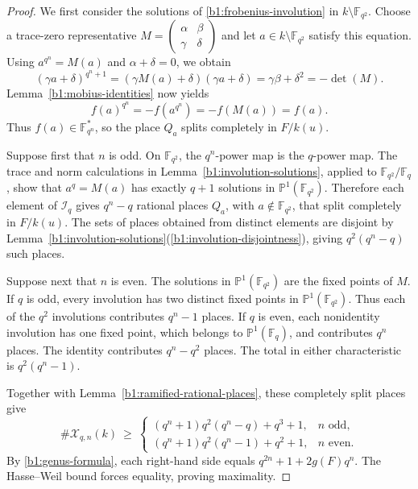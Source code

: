 \documentclass[12pt,reqno]{amsart}
\numberwithin{equation}{section}
\newcommand{\F}{\mathbb F}
\newcommand{\PP}{\mathbb P}
\theoremstyle{plain}
\theoremstyle{definition}
\theoremstyle{remark}
\begin{document}
\begin{proof}
We first consider the solutions of \eqref{b1:frobenius-involution}
in \(k\setminus\F_{q^2}\). Choose a trace-zero representative
\(M=\left(\begin{smallmatrix}\alpha&\beta\\\gamma&\delta\end{smallmatrix}\right)\)
and let \(a\in k\setminus\F_{q^2}\) satisfy this equation.
Using \(a^{q^n}=M(a)\) and \(\alpha+\delta=0\), we obtain
\[
 (\gamma a+\delta)^{q^n+1}
 =(\gamma M(a)+\delta)(\gamma a+\delta)
 =\gamma\beta+\delta^2=-\det(M).
\]
Lemma~\ref{b1:mobius-identities} now yields
\[
 f(a)^{q^n}=-f(a^{q^n})=-f(M(a))=f(a).
\]
Thus \(f(a)\in\F_{q^n}^*\), so the place \(Q_a\) splits completely
in \(F/k(u)\).

Suppose first that \(n\) is odd.  On \(\F_{q^2}\), the
\(q^n\)-power map is the \(q\)-power map. The trace and norm calculations
in Lemma~\ref{b1:involution-solutions}, applied to \(\F_{q^2}/\F_q\),
show that \(a^q=M(a)\) has exactly \(q+1\) solutions in
\(\PP^1(\F_{q^2})\). Therefore each element of \(\mathcal I_q\)
gives \(q^n-q\) rational places \(Q_a\), with \(a\notin\F_{q^2}\),
that split completely in \(F/k(u)\). The sets of places obtained
from distinct elements are disjoint by
Lemma~\ref{b1:involution-solutions}(\ref{b1:involution-disjointness}), giving
\(q^2(q^n-q)\) such places.

Suppose next that \(n\) is even.  The solutions in
\(\PP^1(\F_{q^2})\) are the fixed points of \(M\).
If \(q\) is odd, every involution has two distinct fixed points in
\(\PP^1(\F_{q^2})\).  Thus each of the \(q^2\) involutions contributes
\(q^n-1\) places.  If \(q\) is even, each nonidentity involution has
one fixed point, which belongs to \(\PP^1(\F_q)\), and contributes
\(q^n\) places.  The identity contributes \(q^n-q^2\) places.
The total in either characteristic is \(q^2(q^n-1)\).

Together with Lemma~\ref{b1:ramified-rational-places}, these
completely split places give
\begin{equation}
\label{b1:rational-count}
 \#\mathcal X_{q,n}(k)\ \ge\
 \begin{cases}
 (q^n+1)q^2(q^n-q)+q^3+1,&n\text{ odd},\\
 (q^n+1)q^2(q^n-1)+q^2+1,&n\text{ even}.
 \end{cases}
\end{equation}
By \eqref{b1:genus-formula}, each right-hand side equals
\(q^{2n}+1+2g(F)q^n\). The Hasse--Weil bound forces
equality, proving maximality.
\end{proof}
\end{document}
